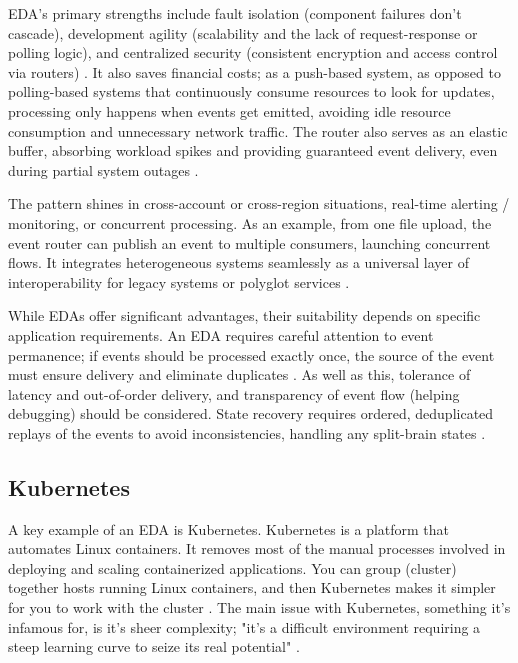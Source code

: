 \documentclass[]{final}
\begin{document}
EDA's primary strengths include fault isolation (component failures don't
cascade), development agility (scalability and the lack of request-response or
polling logic), and centralized security (consistent encryption and access
control via routers) \cite{noauthor_event-driven_nodate}. It also saves financial costs; as a push-based system,
as opposed to polling-based systems that continuously consume resources to
look for updates, processing only happens when events get emitted, avoiding
idle resource consumption and unnecessary network traffic. The router also
serves as an elastic buffer, absorbing workload spikes and providing
guaranteed event delivery, even during partial system outages \cite{noauthor_event-driven_nodate}.

\newpage

The pattern shines in cross-account or cross-region situations, real-time
alerting / monitoring, or concurrent processing. As an example, from one file
upload, the event router can publish an event to multiple consumers, launching
concurrent flows. It integrates heterogeneous systems seamlessly as a universal
layer of interoperability for legacy systems or polyglot services \cite{noauthor_event-driven_nodate}.

While EDAs offer significant advantages, their suitability depends on specific
application requirements. An EDA requires careful attention to event
permanence; if events should be processed exactly once, the source of the
event must ensure delivery and eliminate duplicates \cite{noauthor_event-driven_nodate}. As well as this,
tolerance of latency and out-of-order delivery, and transparency of event
flow (helping debugging) should be considered. State recovery requires
ordered, deduplicated replays of the events to avoid inconsistencies,
handling any split-brain states \cite{noauthor_event-driven_nodate}.

\subsection{Kubernetes}

A key example of an EDA is Kubernetes.
Kubernetes is a platform that automates Linux containers. It removes most of
the manual processes involved in deploying and scaling containerized applications.
You can group (cluster) together hosts running Linux containers, and then
Kubernetes makes it simpler for you to work with the cluster \cite{casey_how_nodate}. The main issue with
Kubernetes, something it's infamous for, is it's sheer complexity; "it’s a
difficult environment requiring a steep learning curve to seize its
real potential" \cite{noauthor_why_nodate}.
\end{document}

